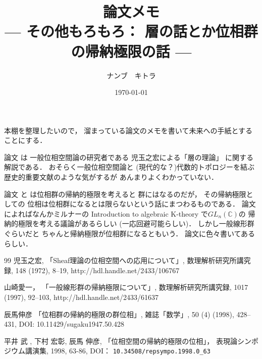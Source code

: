 \documentclass[leqno, a4paper, 12pt]{jsarticle}
\title{論文メモ
\large{\\--- その他もろもろ：
層の話とか位相群の帰納極限の話 ---}
}
\author{ナンブ　キトラ}
\date{\today}
\newcommand{\cc}{\mathbb{C}}
\begin{document}
\maketitle

本棚を整理したいので，
溜まっている論文のメモを書いて未来への手紙とすることにする．



論文
\cite{wa1}
は
一般位相空間論の研究者である
児玉之宏による「層の理論」
に関する解説である．
おそらく一般位相空間論と
(現代的な？)代数的トポロジーを結ぶ
歴史的重要文献のような気がするが
あんまりよくわかっていない．




論文
\cite{wa2}
と
\cite{wa3}
は位相群の帰納的極限を考えると
群にはなるのだが，
その帰納極限としての
位相は位相群になるとは限らないという話にまつわるものである．
論文\cite{wa2}によればなんかミルナーの
Introduction to algebraic K-theory 
で$GL_{n}(\cc)$の
帰納的極限を考える議論があるらしい
(一応回避可能らしい)．
しかし一般線形群ぐらいだと
ちゃんと帰納極限が位相群になるともいう．
論文\cite{wa3}に色々書いてあるらしい．


\begin{thebibliography}{99}
児玉之宏, 
「Sheaf理論の位相空間への応用について」, 
数理解析研究所講究録, 
148 (1972), 
8--19, 
http://hdl.handle.net/2433/106767

山崎愛一，
「一般線形群の帰納極限について」, 
数理解析研究所講究録, 
1017 
(1997), 
92--103, 
http://hdl.handle.net/2433/61637

辰馬伸彦
「位相群の帰納的極限の群位相」, 
雑誌「数学」, 
50 
(4)
(1998), 
428--431, 
DOI: 
10.11429/sugaku1947.50.428

平井 武 , 
下村 宏彰, 
 辰馬 伸彦, 
 「位相空間の帰納的極限の位相」，
表現論シンポジウム講演集, 
1998, 
63-86, 
DOI：
\verb|10.34508/repsympo.1998.0_63|

\end{thebibliography}
\end{document}

